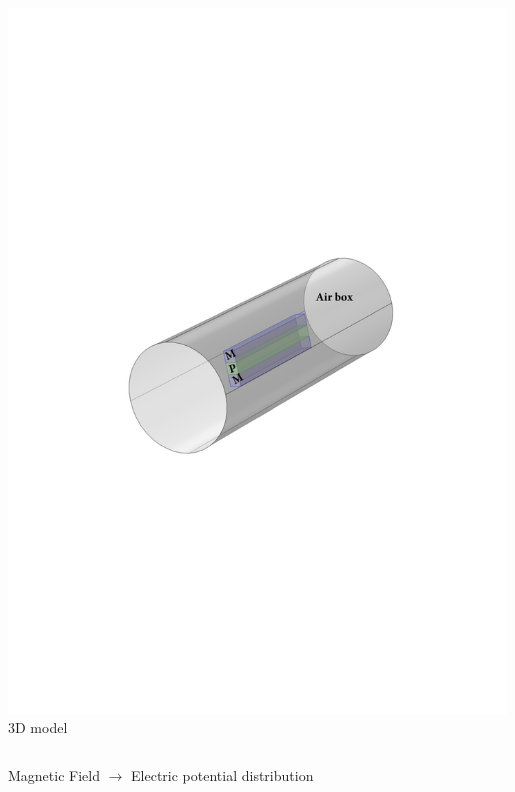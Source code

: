 \documentclass[compress]{beamer}
\begin{document}
\begin{frame}
\begin{columns}[totalwidth=\textwidth]
\begin{column}{.5\textwidth}
 	\includegraphics[width=0.99\textwidth]{Graphic/02_geo.pdf}
	3D model
	\end{column}
\end{columns}
\vspace{0.5cm}
\begin{exampleblock}{} 
  \centering
  Magnetic Field {\color{red} \Large$\mathbf{\boldsymbol{\rightarrow}}$} Electric potential distribution
\end{exampleblock}	
\end{frame}
\end{document}
